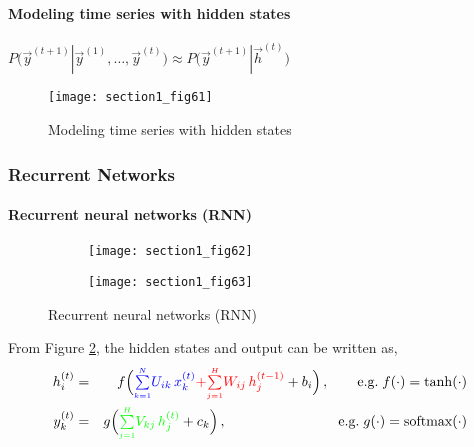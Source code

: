 \paragraph{Modeling time series with hidden states}
$ P\big(\vec y^{(t+1)} | \vec y^{(1)}, \ldots, \vec y^{(t)}\big) 
		\approx P\big( \vec y^{(t+1)} | \vec h^{(t)} \big)$\\
\begin{figure}
	\centering
	\texttt{[image: section1\_fig61]}
	\caption{Modeling time series with hidden states}\label{fig:time_series_model}
\end{figure}

\subsubsection{Recurrent Networks}
\paragraph{Recurrent neural networks (RNN)}
\begin{figure}
	\begin{subfigure}{0.65\textwidth}
	\centering
	\texttt{[image: section1\_fig62]}
	\end{subfigure}
	\begin{subfigure}{0.29\textwidth}
	\centering
	\texttt{[image: section1\_fig63]}
	\end{subfigure}
	\caption{Recurrent neural networks (RNN)}\label{fig:rnn}
\end{figure}
From Figure \ref{fig:rnn}, the hidden states and output can be written as, 
\begin{eqnarray*}
			h_i^{(t)} &=& f\Big({\color{blue}\smallsum{k=1}{N} U_{ik} \, x_k^{(t)}} 
					{{\color{red} + \smallsum{j=1}{H} 
							W_{ij} \, h_j^{(t-1)}}}
					+ b_i \Big) \,,
				\qquad\text{e.g.}\;f(\cdot) = \tanh(\cdot)\\
			y_k^{(t)} &=& g\Big({\color{green}\smallsum{j=1}{H} 
					V_{kj} \, h_j^{(t)}} + c_k\Big) \,,
				\hspace{28mm}\text{e.g.}\;g(\cdot) = \text{\rm softmax}(\cdot)
\end{eqnarray*}


